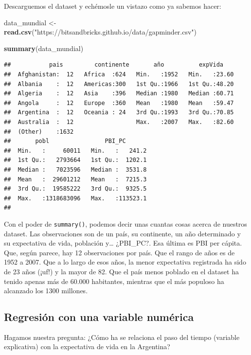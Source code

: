 \documentclass[]{book}
\newenvironment{Shaded}{\begin{snugshade}}{\end{snugshade}}
\newcommand{\KeywordTok}[1]{\textcolor[rgb]{0.13,0.29,0.53}{\textbf{#1}}}
\newcommand{\StringTok}[1]{\textcolor[rgb]{0.31,0.60,0.02}{#1}}
\newcommand{\NormalTok}[1]{#1}
\begin{document}
Descarguemos el dataset y echémosle un vistazo como ya sabemos hacer:

\begin{Shaded}
\begin{Highlighting}[]
\NormalTok{data_mundial <-}\StringTok{ }\KeywordTok{read.csv}\NormalTok{(}\StringTok{"https://bitsandbricks.github.io/data/gapminder.csv"}\NormalTok{)}

\KeywordTok{summary}\NormalTok{(data_mundial)}
\end{Highlighting}
\end{Shaded}

\begin{verbatim}
##           pais         continente       año          expVida     
##  Afghanistan:  12   Africa  :624   Min.   :1952   Min.   :23.60  
##  Albania    :  12   Americas:300   1st Qu.:1966   1st Qu.:48.20  
##  Algeria    :  12   Asia    :396   Median :1980   Median :60.71  
##  Angola     :  12   Europe  :360   Mean   :1980   Mean   :59.47  
##  Argentina  :  12   Oceania : 24   3rd Qu.:1993   3rd Qu.:70.85  
##  Australia  :  12                  Max.   :2007   Max.   :82.60  
##  (Other)    :1632                                                
##       pobl                PBI_PC        
##  Min.   :     60011   Min.   :   241.2  
##  1st Qu.:   2793664   1st Qu.:  1202.1  
##  Median :   7023596   Median :  3531.8  
##  Mean   :  29601212   Mean   :  7215.3  
##  3rd Qu.:  19585222   3rd Qu.:  9325.5  
##  Max.   :1318683096   Max.   :113523.1  
## 
\end{verbatim}

Con el poder de \texttt{summary()}, podemos decir unas cuantas cosas
acerca de nuestros dataset. Las observaciones son de un país, su
continente, un año determinado y su expectativa de vida, población
y\ldots{} ¿PBI\_PC?. Esa última es PBI per cápita. Que, según parece,
hay 12 observaciones por país. Que el rango de años es de 1952 a 2007.
Que a lo largo de esos años, la menor expectativa registrada ha sido de
23 años (¡uf!) y la mayor de 82. Que el país menos poblado en el dataset
ha tenido apenas más de 60.000 habitantes, mientras que el más populoso
ha alcanzado los 1300 millones.

\subsection{Regresión con una variable
numérica}\label{regresion-con-una-variable-numerica}

Hagamos nuestra pregunta: ¿Cómo ha se relaciona el paso del tiempo
(variable explicativa) con la expectativa de vida en la Argentina?
\end{document}
